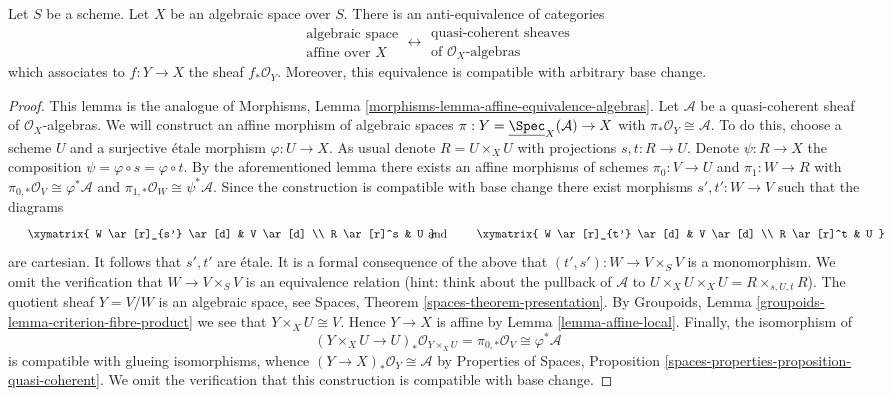 \begin{lemma}
\label{lemma-affine-equivalence-algebras}
Let $S$ be a scheme. Let $X$ be an algebraic space over $S$.
There is an anti-equivalence of categories
$$
\begin{matrix}
\text{algebraic space} \\
\text{affine over }X
\end{matrix}
\longleftrightarrow
\begin{matrix}
\text{quasi-coherent sheaves} \\
\text{of }\mathcal{O}_X\text{-algebras}
\end{matrix}
$$
which associates to $f : Y \to X$ the sheaf $f_*\mathcal{O}_Y$.
Moreover, this equivalence is compatible with arbitrary base change.
\end{lemma}

\begin{proof}
This lemma is the analogue of Morphisms, Lemma
\ref{morphisms-lemma-affine-equivalence-algebras}.
Let $\mathcal{A}$ be a quasi-coherent sheaf of $\mathcal{O}_X$-algebras.
We will construct an affine morphism of algebraic spaces
$\pi : Y = \underline{\Spec}_X(\mathcal{A}) \to X$ with
$\pi_*\mathcal{O}_Y \cong \mathcal{A}$. To do this, choose a scheme
$U$ and a surjective \'etale morphism $\varphi : U \to X$. As usual
denote $R = U \times_X U$ with projections $s, t : R \to U$. Denote
$\psi : R \to X$ the composition $\psi = \varphi \circ s = \varphi \circ t$.
By the aforementioned lemma there exists an affine morphisms of schemes
$\pi_0 : V \to U$ and $\pi_1 : W \to R$ with
$\pi_{0, *}\mathcal{O}_V \cong \varphi^*\mathcal{A}$ and
$\pi_{1, *}\mathcal{O}_W \cong \psi^*\mathcal{A}$.
Since the construction is compatible with base change there exist
morphisms $s', t' : W \to V$ such that the diagrams
$$
\vcenter{
\xymatrix{
W \ar[r]_{s'} \ar[d] & V \ar[d] \\
R \ar[r]^s & U
}
}
\quad\text{and}\quad
\vcenter{
\xymatrix{
W \ar[r]_{t'} \ar[d] & V \ar[d] \\
R \ar[r]^t & U
}
}
$$
are cartesian. It follows that $s', t'$ are \'etale. It is a formal
consequence of the above that $(t', s') : W \to V \times_S V$ is a
monomorphism. We omit the verification that $W \to V \times_S V$ is an
equivalence relation (hint: think about the pullback of $\mathcal{A}$
to $U \times_X U \times_X U = R \times_{s, U, t} R$).
The quotient sheaf $Y = V/W$
is an algebraic space, see
Spaces, Theorem \ref{spaces-theorem-presentation}.
By Groupoids, Lemma \ref{groupoids-lemma-criterion-fibre-product}
we see that $Y \times_X U \cong V$. Hence $Y \to X$ is affine by
Lemma \ref{lemma-affine-local}. Finally, the isomorphism of
$$
(Y \times_X U \to U)_*\mathcal{O}_{Y \times_X U} =
\pi_{0, *}\mathcal{O}_V \cong \varphi^*\mathcal{A}
$$
is compatible with glueing isomorphisms, whence
$(Y \to X)_*\mathcal{O}_Y \cong \mathcal{A}$ by
Properties of Spaces, Proposition
\ref{spaces-properties-proposition-quasi-coherent}.
We omit the verification that this construction is compatible with
base change.
\end{proof}

